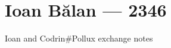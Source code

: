 \hypertarget{ioan-bux103lan-2346}{%
\chapter{Ioan Bălan — 2346}\label{ioan-bux103lan-2346}}

Ioan and Codrin\#Pollux exchange notes
